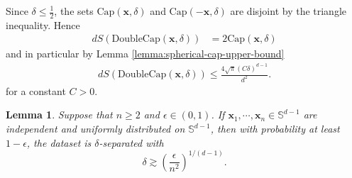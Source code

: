 \documentclass{article}
\newtheorem{lemma}[theorem]{Lemma}
\theoremstyle{definition}
\renewcommand{\S}{\mathbb{S}}
\def\vx{{\bm{x}}}
\begin{document}
        Since $\delta \leq \frac{1}{2}$, the sets $\text{Cap}(\vx, \delta)$ and $\text{Cap}(-\vx, \delta)$ are disjoint by the triangle inequality. Hence
    \begin{align*}
        dS(\text{DoubleCap}(\vx, \delta)) &= 2 \text{Cap}(\vx, \delta)
    \end{align*}
    and in particular by Lemma \ref{lemma:spherical-cap-upper-bound}
    \begin{align}
         dS(\text{DoubleCap}(\vx, \delta)) \leq \frac{4\sqrt{\pi}(C\delta)^{d - 1} }{d^2}. \label{eqn:double-spherical-cap-bound}
    \end{align}
    for a constant $C > 0$.

\begin{lemma}\label{lemma:sphere-separation}
    Suppose that $n \geq 2$ and $\epsilon \in (0, 1)$. If $\vx_1, \cdots, \vx_n \in \S^{d - 1}$ are independent and uniformly distributed on $\S^{d - 1}$, then with probability at least $1 - \epsilon$, the dataset is $\delta$-separated with
    \[\delta  \gtrsim \left(\frac{\epsilon}{n^2}\right)^{1/(d - 1)}.  \]
\end{lemma}
\end{document}
